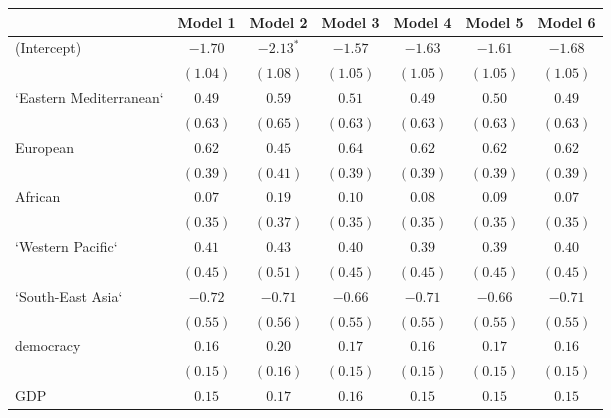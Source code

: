 
\begin{table}[!h]
\begin{center}
\begin{tabular}{l c c c c c c }
\toprule
 & Model 1 & Model 2 & Model 3 & Model 4 & Model 5 & Model 6 \\
\midrule
(Intercept)             & $-1.70$      & $-2.13^{*}$  & $-1.57$      & $-1.63$      & $-1.61$      & $-1.68$      \\
                        & $(1.04)$     & $(1.08)$     & $(1.05)$     & $(1.05)$     & $(1.05)$     & $(1.05)$     \\
`Eastern Mediterranean` & $0.49$       & $0.59$       & $0.51$       & $0.49$       & $0.50$       & $0.49$       \\
                        & $(0.63)$     & $(0.65)$     & $(0.63)$     & $(0.63)$     & $(0.63)$     & $(0.63)$     \\
European                & $0.62$       & $0.45$       & $0.64$       & $0.62$       & $0.62$       & $0.62$       \\
                        & $(0.39)$     & $(0.41)$     & $(0.39)$     & $(0.39)$     & $(0.39)$     & $(0.39)$     \\
African                 & $0.07$       & $0.19$       & $0.10$       & $0.08$       & $0.09$       & $0.07$       \\
                        & $(0.35)$     & $(0.37)$     & $(0.35)$     & $(0.35)$     & $(0.35)$     & $(0.35)$     \\
`Western Pacific`       & $0.41$       & $0.43$       & $0.40$       & $0.39$       & $0.39$       & $0.40$       \\
                        & $(0.45)$     & $(0.51)$     & $(0.45)$     & $(0.45)$     & $(0.45)$     & $(0.45)$     \\
`South-East Asia`       & $-0.72$      & $-0.71$      & $-0.66$      & $-0.71$      & $-0.66$      & $-0.71$      \\
                        & $(0.55)$     & $(0.56)$     & $(0.55)$     & $(0.55)$     & $(0.55)$     & $(0.55)$     \\
democracy               & $0.16$       & $0.20$       & $0.17$       & $0.16$       & $0.17$       & $0.16$       \\
                        & $(0.15)$     & $(0.16)$     & $(0.15)$     & $(0.15)$     & $(0.15)$     & $(0.15)$     \\
GDP                     & $0.15$       & $0.17$       & $0.16$       & $0.15$       & $0.15$       & $0.15$       \\

\end{tabular}
\end{center}
\end{table}
